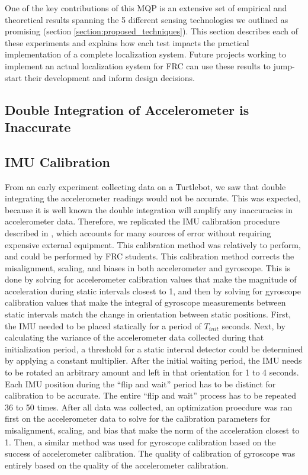 \documentclass{article}
\begin{document}
  One of the key contributions of this MQP is an extensive set of empirical and theoretical results spanning the 5 different sensing technologies we outlined as promising (section \ref{section:proposed_techniques}). This section describes each of these experiments and explains how each test impacts the practical implementation of a complete localization system. Future projects working to implement an actual localization system for FRC can use these results to jump-start their development and inform design decisions.

  \subsection{Double Integration of Accelerometer is Inaccurate} \label{section:double_integration_is_inaccurate}

  \subsection{IMU Calibration} \label{section:imu_calibration}

    From an early experiment collecting data on a Turtlebot, we saw that double integrating the accelerometer readings would not be accurate. This was expected, because it is well known the double integration will amplify any inaccuracies in accelerometer data. Therefore, we replicated the IMU calibration procedure described in \cite{tedaldi_robust_2014}, which accounts for many sources of error without requiring expensive external equipment. This calibration method was relatively to perform, and could be performed by FRC students. This calibration method corrects the misalignment, scaling, and biases in both accelerometer and gyroscope. This is done by solving for accelerometer calibration values that make the magnitude of acceleration during static intervals closest to 1, and then by solving for gyroscope calibration values that make the integral of gyroscope measurements between static intervals match the change in orientation between static positions. First, the IMU needed to be placed statically for a period of $T_{init}$ seconds. Next, by calculating the variance of the accelerometer data collected during that initialization period, a threshold for a static interval detector could be determined by applying a constant multiplier. After the initial waiting period, the IMU needs to be rotated an arbitrary amount and left in that orientation for 1 to 4 seconds. Each IMU position during the ``flip and wait'' period has to be distinct for calibration to be accurate. The entire ``flip and wait'' process has to be repeated 36 to 50 times. After all data was collected, an optimization proecdure was ran first on the accelerometer data to solve for the calibration parameters for misalignment, scaling, and bias that make the norm of the acceleration closest to 1. Then, a similar method was used for gyroscope calibration based on the success of accelerometer calibration. The quality of calibration of gyroscope was entirely based on the quality of the accelerometer calibration.
\end{document}
